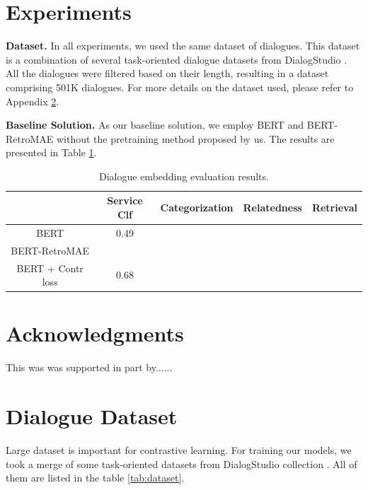 \documentclass{article}
\begin{document}
\section{Experiments}

\textbf{Dataset.} In all experiments, we used the same dataset of dialogues. This dataset is a combination of several task-oriented dialogue datasets from DialogStudio \cite{zhang2023dialogstudio}. All the dialogues were filtered based on their length, resulting in a dataset comprising 501K dialogues. For more details on the dataset used, please refer to Appendix \ref{app:dataset}.

\textbf{Baseline Solution.} As our baseline solution, we employ BERT and BERT-RetroMAE without the pretraining method proposed by us. The results are presented in Table \ref{tab:eval}.

\begin{table}[!htb]
    \centering
    \begin{tabular}{c|c|c|c|c}
        & Service Clf & Categorization & Relatedness & Retrieval \\
        \hline
        BERT & 0.49 & & & \\
        BERT-RetroMAE & & & & \\
        BERT + Contr loss & 0.68 & & &
    \end{tabular}
    \caption{Dialogue embedding evaluation results.}
    \label{tab:eval}
\end{table}

\section*{Acknowledgments}
This was was supported in part by......

  
  

\appendix
\section{Dialogue Dataset} \label{app:dataset}
Large dataset is important for contrastive learning. For training our models, we took a merge of some task-oriented datasets from DialogStudio collection \cite{zhang2023dialogstudio}. All of them are listed in the table \ref{tab:dataset}.
\end{document}
